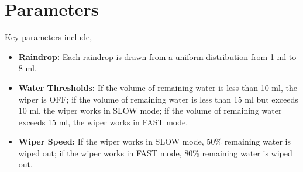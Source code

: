 \section{Parameters}
Key parameters include,
\begin{itemize}
    \item \textbf{Raindrop:} Each raindrop is drawn from a uniform distribution from 1 ml to 8 ml.
    \item \textbf{Water Thresholds:} If the volume of remaining water is less than 10 ml, the wiper is OFF; if the volume of remaining water is less than 15 ml but exceeds 10 ml, the wiper works in SLOW mode; if the volume of remaining water exceeds 15 ml, the wiper works in FAST mode.
    \item \textbf{Wiper Speed:} If the wiper works in SLOW mode, 50\% remaining water is wiped out; if the wiper works in FAST mode, 80\% remaining water is wiped out.
\end{itemize}